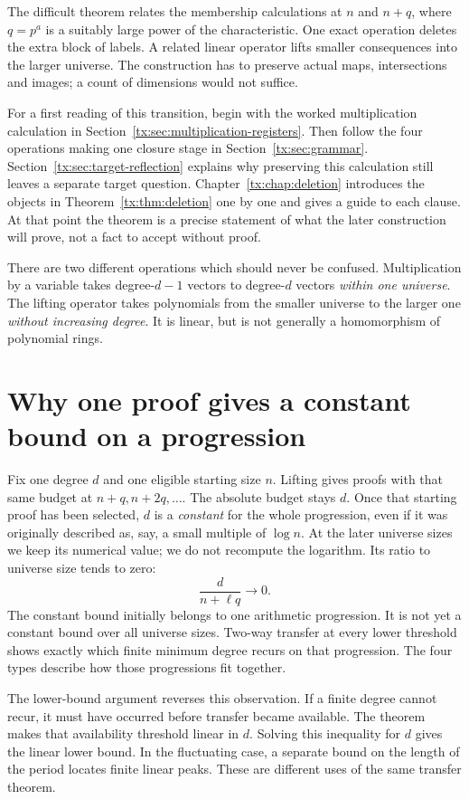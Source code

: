 \documentclass[11pt,a4paper,oneside,openany]{book}
\theoremstyle{definition}\newtheorem{definition}[theorem]{Definition}
\theoremstyle{remark}\newtheorem{remark}[theorem]{Remark}
\numberwithin{equation}{chapter}
\begin{document}
The difficult theorem relates the membership calculations at $n$ and
$n+q$, where $q=p^a$ is a suitably large power of the characteristic.
One exact operation deletes the extra block of labels. A related linear
operator lifts smaller consequences into the larger universe. The
construction has to preserve actual maps, intersections and images;
a count of dimensions would not suffice.

For a first reading of this transition, begin with the worked
multiplication calculation in Section~\ref{tx:sec:multiplication-registers}.
Then follow the four operations making one closure stage in
Section~\ref{tx:sec:grammar}. Section~\ref{tx:sec:target-reflection}
explains why preserving this calculation still leaves a separate
target question. Chapter~\ref{tx:chap:deletion} introduces the objects
in Theorem~\ref{tx:thm:deletion} one by one and gives a guide to each
clause. At that point the theorem is a precise statement of what
the later construction will prove, not a fact to accept without proof.

There are two different operations which should never be confused.
Multiplication by a variable takes degree-$d-1$ vectors to degree-$d$
vectors \emph{within one universe}. The lifting operator takes
polynomials from the smaller universe to the larger one \emph{without
increasing degree}. It is linear, but is not generally a homomorphism
of polynomial rings.

\section*{Why one proof gives a constant bound on a progression}
Fix one degree $d$ and one eligible starting size $n$. Lifting gives
proofs with that same budget at $n+q,n+2q,\ldots$. The absolute budget
stays $d$. Once that starting proof has been selected, $d$ is a
\emph{constant} for the whole progression, even if it was originally
described as, say, a small multiple of $\log n$. At the later universe sizes
we keep its numerical value; we do not recompute the logarithm.
Its ratio to universe size tends to zero:
\[
                         \frac{d}{n+\ell q}\longrightarrow0.
\]
The constant bound initially belongs to one arithmetic progression.
It is not yet a constant bound over all universe sizes. Two-way transfer
at every lower threshold shows exactly which finite minimum degree
recurs on that progression. The four types describe how those
progressions fit together.

The lower-bound argument reverses this observation. If a finite degree
cannot recur, it must have occurred before transfer became available.
The theorem makes that availability threshold linear in $d$. Solving
this inequality for $d$ gives the linear lower bound. In the fluctuating
case, a separate bound on the length of the period locates finite linear
peaks. These are different uses of the same transfer theorem.
\end{document}
